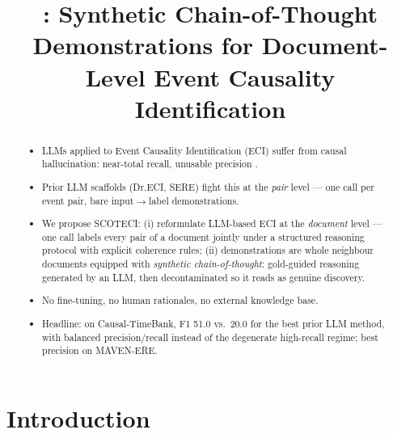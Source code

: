 \documentclass[11pt]{article}
\title{\method{}: Synthetic Chain-of-Thought Demonstrations for Document-Level Event Causality Identification\\
{\normalsize \todo{working title --- alternatives: ``Documents, not Pairs: ...'' / ``Rationalized Few-Shot Prompting for Document-Level ECI''}}}
\author{}
\date{}
\newcommand{\method}{SCOTECI}
\begin{document}
\maketitle

\begin{abstract}
\begin{itemize}
  \item LLMs applied to Event Causality Identification (ECI) suffer from causal
        hallucination: near-total recall, unusable precision \citep{gao2023chatgpt}.
  \item Prior LLM scaffolds (Dr.ECI, SERE) fight this at the \emph{pair} level ---
        one call per event pair, bare input$\to$label demonstrations.
  \item We propose \method{}: (i) reformulate LLM-based ECI at the \emph{document}
        level --- one call labels every pair of a document jointly under a structured
        reasoning protocol with explicit coherence rules; (ii) demonstrations are
        whole neighbour documents equipped with \emph{synthetic chain-of-thought}:
        gold-guided reasoning generated by an LLM, then decontaminated so it reads
        as genuine discovery.
  \item No fine-tuning, no human rationales, no external knowledge base.
  \item Headline: on Causal-TimeBank, F1 51.0 vs.\ 20.0 for the best prior
        LLM method, with balanced precision/recall instead of the degenerate
        high-recall regime; best precision on MAVEN-ERE.
\end{itemize}
\end{abstract}

\section{Introduction}
\label{sec:intro}
\end{document}
